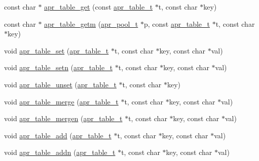 \begin{DoxyCompactItemize}
\item 
const char $\ast$ \hyperlink{group__apr__tables_ga4db13e3915c6b9a3142b175d4c15d915}{apr\-\_\-table\-\_\-get} (const \hyperlink{group__apr__tables_gad7ea82d6608a4a633fc3775694ab71e4}{apr\-\_\-table\-\_\-t} $\ast$t, const char $\ast$key)
\item 
const char $\ast$ \hyperlink{group__apr__tables_gaa52177e485731ec599d04f863872c5f3}{apr\-\_\-table\-\_\-getm} (\hyperlink{group__apr__pools_gaf137f28edcf9a086cd6bc36c20d7cdfb}{apr\-\_\-pool\-\_\-t} $\ast$p, const \hyperlink{group__apr__tables_gad7ea82d6608a4a633fc3775694ab71e4}{apr\-\_\-table\-\_\-t} $\ast$t, const char $\ast$key)
\item 
void \hyperlink{group__apr__tables_gaf101d92c2f6343cdf4ec062ff416f244}{apr\-\_\-table\-\_\-set} (\hyperlink{group__apr__tables_gad7ea82d6608a4a633fc3775694ab71e4}{apr\-\_\-table\-\_\-t} $\ast$t, const char $\ast$key, const char $\ast$val)
\item 
void \hyperlink{group__apr__tables_ga1fe7bb25d4027bb79d3c2bb41d8d8b75}{apr\-\_\-table\-\_\-setn} (\hyperlink{group__apr__tables_gad7ea82d6608a4a633fc3775694ab71e4}{apr\-\_\-table\-\_\-t} $\ast$t, const char $\ast$key, const char $\ast$val)
\item 
void \hyperlink{group__apr__tables_gab0df7a237feb4cd9beed201f4e236127}{apr\-\_\-table\-\_\-unset} (\hyperlink{group__apr__tables_gad7ea82d6608a4a633fc3775694ab71e4}{apr\-\_\-table\-\_\-t} $\ast$t, const char $\ast$key)
\item 
void \hyperlink{group__apr__tables_gad5d10eca30b76fb44d999b4dfda8d632}{apr\-\_\-table\-\_\-merge} (\hyperlink{group__apr__tables_gad7ea82d6608a4a633fc3775694ab71e4}{apr\-\_\-table\-\_\-t} $\ast$t, const char $\ast$key, const char $\ast$val)
\item 
void \hyperlink{group__apr__tables_ga1d50805448114c476cfcd00d5ee3e3a8}{apr\-\_\-table\-\_\-mergen} (\hyperlink{group__apr__tables_gad7ea82d6608a4a633fc3775694ab71e4}{apr\-\_\-table\-\_\-t} $\ast$t, const char $\ast$key, const char $\ast$val)
\item 
void \hyperlink{group__apr__tables_gab2ea874754a0fbf139b7316c1f837f12}{apr\-\_\-table\-\_\-add} (\hyperlink{group__apr__tables_gad7ea82d6608a4a633fc3775694ab71e4}{apr\-\_\-table\-\_\-t} $\ast$t, const char $\ast$key, const char $\ast$val)
\item 
void \hyperlink{group__apr__tables_gaff9fdbd8f499f0dfb07123230e19ea54}{apr\-\_\-table\-\_\-addn} (\hyperlink{group__apr__tables_gad7ea82d6608a4a633fc3775694ab71e4}{apr\-\_\-table\-\_\-t} $\ast$t, const char $\ast$key, const char $\ast$val)

\end{DoxyCompactItemize}

